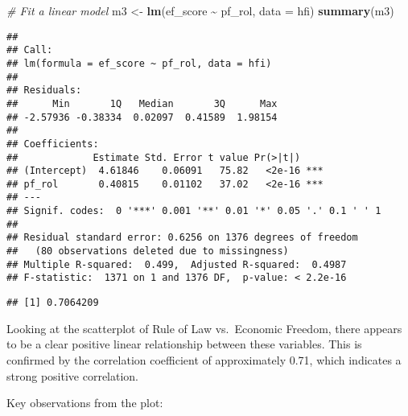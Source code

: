 \documentclass[
]{article}
\newenvironment{Shaded}{\begin{snugshade}}{\end{snugshade}}
\newcommand{\AttributeTok}[1]{\textcolor[rgb]{0.13,0.29,0.53}{#1}}
\newcommand{\CommentTok}[1]{\textcolor[rgb]{0.56,0.35,0.01}{\textit{#1}}}
\newcommand{\FunctionTok}[1]{\textcolor[rgb]{0.13,0.29,0.53}{\textbf{#1}}}
\newcommand{\NormalTok}[1]{#1}
\newcommand{\OtherTok}[1]{\textcolor[rgb]{0.56,0.35,0.01}{#1}}
\newcommand{\SpecialCharTok}[1]{\textcolor[rgb]{0.81,0.36,0.00}{\textbf{#1}}}
\newcommand{\StringTok}[1]{\textcolor[rgb]{0.31,0.60,0.02}{#1}}
\begin{document}
\begin{Shaded}
\begin{Highlighting}[]
\CommentTok{\# Fit a linear model}
\NormalTok{m3 }\OtherTok{\textless{}{-}} \FunctionTok{lm}\NormalTok{(ef\_score }\SpecialCharTok{\textasciitilde{}}\NormalTok{ pf\_rol, }\AttributeTok{data =}\NormalTok{ hfi)}
\FunctionTok{summary}\NormalTok{(m3)}
\end{Highlighting}
\end{Shaded}

\begin{verbatim}
## 
## Call:
## lm(formula = ef_score ~ pf_rol, data = hfi)
## 
## Residuals:
##      Min       1Q   Median       3Q      Max 
## -2.57936 -0.38334  0.02097  0.41589  1.98154 
## 
## Coefficients:
##             Estimate Std. Error t value Pr(>|t|)    
## (Intercept)  4.61846    0.06091   75.82   <2e-16 ***
## pf_rol       0.40815    0.01102   37.02   <2e-16 ***
## ---
## Signif. codes:  0 '***' 0.001 '**' 0.01 '*' 0.05 '.' 0.1 ' ' 1
## 
## Residual standard error: 0.6256 on 1376 degrees of freedom
##   (80 observations deleted due to missingness)
## Multiple R-squared:  0.499,  Adjusted R-squared:  0.4987 
## F-statistic:  1371 on 1 and 1376 DF,  p-value: < 2.2e-16
\end{verbatim}

\begin{Shaded}
\end{Shaded}

\begin{verbatim}
## [1] 0.7064209
\end{verbatim}

Looking at the scatterplot of Rule of Law vs.~Economic Freedom, there
appears to be a clear positive linear relationship between these
variables. This is confirmed by the correlation coefficient of
approximately 0.71, which indicates a strong positive correlation.

Key observations from the plot:
\end{document}
